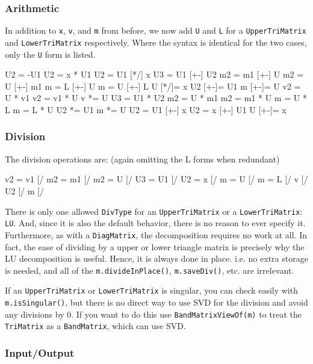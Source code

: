 \documentclass[twoside,letterpaper,11pt]{article}
\renewcommand{\tt}[1]{{\lstinline {#1}}}
\begin{document}
\subsubsection{Arithmetic}

In addition to \tt{x}, \tt{v}, and \tt{m} from before, 
we now add \tt{U} and \tt{L} for a \tt{UpperTriMatrix}
and \tt{LowerTriMatrix} respectively.  Where the syntax is identical
for the two cases, only the \tt{U} form is listed.

\begin{tmvcode}
U2 = -U1
U2 = x * U1
U2 = U1 [*/] x
U3 = U1 [+-] U2
m2 = m1 [+-] U
m2 = U [+-] m1
m = L [+-] U
m = U [+-] L
U [*/]= x
U2 [+-]= U1
m [+-]= U
v2 = U * v1
v2 = v1 * U
v *= U
U3 = U1 * U2
m2 = U * m1
m2 = m1 * U
m = U * L
m = L * U
U2 *= U1
m *= U
U2 = U1 [+-] x
U2 = x [+-] U1
U [+-]= x
\end{tmvcode}

\subsubsection{Division}

The division operations are: (again omitting the L forms when redundant)
\begin{tmvcode}
v2 = v1 [/%
m2 = m1 [/%
m2 = U [/%
U3 = U1 [/%
U2 = x [/%
m = U [/%
m = L [/%
v [/%
U2 [/%
m [/%
\end{tmvcode}

There is only one allowed \tt{DivType} for an \tt{UpperTriMatrix} or a 
\tt{LowerTriMatrix}: \tt{LU}.
And, since it is also the default behavior,
there is no reason to ever specify it.
Furthermore, as with a \tt{DiagMatrix},
the decomposition requires no work at all.  In fact, the ease of dividing by a 
upper or lower triangle matrix is precisely why the LU decomposition is useful.
Hence, it is always done in place.  i.e. no extra storage is needed, and all of
the \tt{m.divideInPlace()}, \tt{m.saveDiv()}, etc. are irrelevant.

If an \tt{UpperTriMatrix} or \tt{LowerTriMatrix} is singular, 
you can check easily with \tt{m.isSingular()},
but there is no direct way to use SVD for the division and avoid any
divisions by 0.  If you want to do this use \tt{BandMatrixViewOf(m)} to 
treat the \tt{TriMatrix} as a \tt{BandMatrix}, which can use SVD.

\subsubsection{Input/Output}
\end{document}
